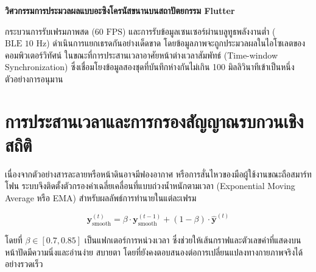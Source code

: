 \begin{theorybox}
\textbf{วิศวกรรมการประมวลผลแบบอะซิงโครนัสขนานบนสถาปัตยกรรม Flutter}\par
กระบวนการรับเฟรมภาพสด ($60\text{ FPS}$) และการรับข้อมูลเซนเซอร์ผ่านบลูทูธพลังงานต่ำ ($\text{BLE } 10\text{ Hz}$) ดำเนินการแยกเธรดกันอย่างเด็ดขาด โดยข้อมูลภาพจะถูกประมวลผลในไอโซเลตของคอมพิวเตอร์วิทัศน์ ในขณะที่การประสานเวลาอาศัยหน้าต่างเวลาสัมพัทธ์ (Time-window Synchronization) ซึ่งเชื่อมโยงข้อมูลสองชุดที่บันทึกห่างกันไม่เกิน 100 มิลลิวินาทีเข้าเป็นหนึ่งตัวอย่างการอนุมาน
\end{theorybox}

\section{การประสานเวลาและการกรองสัญญาณรบกวนเชิงสถิติ}

เนื่องจากตัวอย่างสารละลายหรือหน้าดินอาจมีฟองอากาศ หรือการสั่นไหวของมือผู้ใช้งานขณะถือสมาร์ทโฟน ระบบจึงติดตั้งตัวกรองค่าเฉลี่ยเคลื่อนที่แบบถ่วงน้ำหนักตามเวลา (Exponential Moving Average หรือ EMA) สำหรับผลลัพธ์การทำนายในแต่ละเฟรม

\begin{equation}
\mathbf{y}_{\text{smooth}}^{(t)} = \beta \cdot \mathbf{y}_{\text{smooth}}^{(t-1)} + (1 - \beta) \cdot \widehat{\mathbf{y}}^{(t)}
\end{equation}

โดยที่ $\beta \in [0.7, 0.85]$ เป็นแฟกเตอร์การหน่วงเวลา ซึ่งช่วยให้เส้นกราฟและตัวเลขค่าที่แสดงบนหน้าปัดมีความนิ่งและอ่านง่าย สบายตา โดยที่ยังคงตอบสนองต่อการเปลี่ยนแปลงทางกายภาพจริงได้อย่างรวดเร็ว
